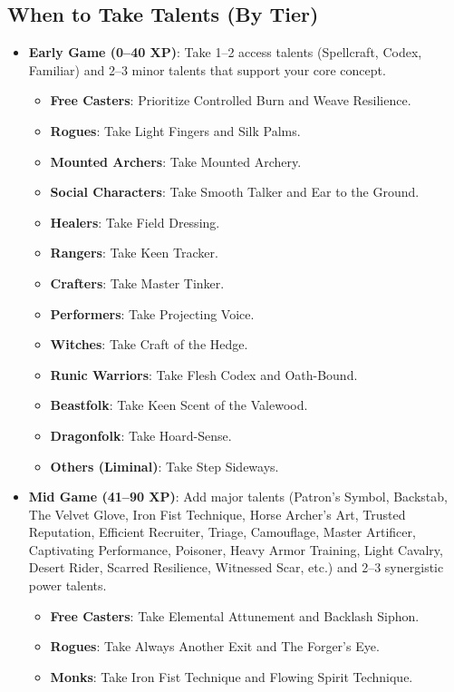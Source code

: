 \documentclass[12pt,a4paper]{book}
\begin{document}
\subsection*{When to Take Talents (By Tier)}
\label{sec:when-to-take-talents}
\begin{itemize}
  \item \textbf{Early Game (0--40 XP)}: Take 1--2 access talents (Spellcraft, Codex, Familiar) and 2--3 minor talents that support your core concept.
  \begin{itemize}
  \item \textbf{Free Casters}: Prioritize Controlled Burn and Weave Resilience.
  \item \textbf{Rogues}: Take Light Fingers and Silk Palms.
  \item \textbf{Mounted Archers}: Take Mounted Archery.
  \item \textbf{Social Characters}: Take Smooth Talker and Ear to the Ground.
  \item \textbf{Healers}: Take Field Dressing.
  \item \textbf{Rangers}: Take Keen Tracker.
  \item \textbf{Crafters}: Take Master Tinker.
  \item \textbf{Performers}: Take Projecting Voice.
  \item \textbf{Witches}: Take Craft of the Hedge.
  \item \textbf{Runic Warriors}: Take Flesh Codex and Oath-Bound.
  \item \textbf{Beastfolk}: Take Keen Scent of the Valewood.
  \item \textbf{Dragonfolk}: Take Hoard-Sense.
  \item \textbf{Others (Liminal)}: Take Step Sideways.
  \end{itemize}
  \item \textbf{Mid Game (41--90 XP)}: Add major talents (Patron's Symbol, Backstab, The Velvet Glove, Iron Fist Technique, Horse Archer's Art, Trusted Reputation, Efficient Recruiter, Triage, Camouflage, Master Artificer, Captivating Performance, Poisoner, Heavy Armor Training, Light Cavalry, Desert Rider, Scarred Resilience, Witnessed Scar, etc.) and 2--3 synergistic power talents.
  \begin{itemize}
  \item \textbf{Free Casters}: Take Elemental Attunement and Backlash Siphon.
  \item \textbf{Rogues}: Take Always Another Exit and The Forger's Eye.
  \item \textbf{Monks}: Take Iron Fist Technique and Flowing Spirit Technique.

\end{itemize}
\end{itemize}
\end{document}
